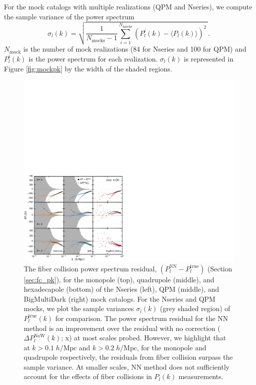 For the mock catalogs with multiple realizations (QPM and Nseries), we 
compute the sample variance of the power spectrum
\begin{equation} \label{eq:pk_var}
\sigma_l (k)= \sqrt{\frac{1}{N_\mathrm{mocks}-1} \sum\limits_{i=1}^{N_\mathrm{mocks}} (P^i_l(k)- \langle{P_l(k)}\rangle)^2 \ }. 
\end{equation}
$N_\mathrm{mock}$ is the number of mock realizations (84 for Nseries and 100 for 
QPM) and $P^i_l(k)$ is the power spectrum for each realization. $\sigma_l(k)$ is 
represented in Figure \ref{fig:mockpk} by the width of the shaded regions. 
\begin{figure}
\begin{center}
\includegraphics[scale=0.55]{figs/fc/mock_catalog_NN_true_P024k_resid_rebin6x.pdf} 
\caption{The fiber collision power spectrum residual, 
$(P_l^\mathrm{NN}-P_l^\mathrm{true})$ 
(Section \ref{sec:fc_pk}), for the monopole (top), quadrupole 
(middle), and hexadecapole (bottom) of the Nseries (left), QPM (middle), and 
BigMultiDark (right) mock catalogs. For the Nseries and QPM mocks, 
we plot the sample variances $\sigma_l(k)$ (grey shaded region) of 
$P_l^\mathrm{true}(k)$ for comparison. The power spectrum residual for the 
NN method is an improvement over the residual with no correction 
($\Delta P_l^\mathrm{NoW}(k)$; x) at most scales probed. 
However, we highlight that at $k > 0.1 \;h/\mathrm{Mpc}$ and 
$k > 0.2\;h/\mathrm{Mpc}$, for the monopole and quadrupole 
respectively, the residuals from fiber collision surpass the sample 
variance. 
At smaller scales, NN method does not sufficiently account for 
the effects of fiber collisions in $P_l(k)$ measurements.}
\label{fig:fc_pk}
\end{center}
\end{figure}

